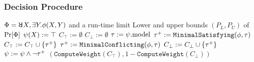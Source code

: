 \begin{frame}
  \frametitle{Decision Procedure}
  {\scriptsize
    \begin{algorithmic}[1]
      \REQUIRE
      $\Qf=\random{} X,\exists Y.\pf(X,Y)$ and a run-time limit \timeout
      \ENSURE
      Lower and upper bounds $(P_L,P_U)$ of $\Pr[\Phi]$
      \STATE $\psi(X) := \top$
      \STATE $C_\top := \emptyset$
      \STATE $C_\bot := \emptyset$
      \STATE $\tau := \psi.\mathrm{model}$
      \IF{($\sat{\pcf{\pf}{\as}}$)}
      \STATE $\tau^+ := \texttt{MinimalSatisfying}(\phi,\tau)$
      \STATE $C_\top := C_\top \cup \{\tau^+\}$
      \ELSE
      \STATE $\tau^+ := \texttt{MinimalConflicting}(\phi,\tau)$
      \STATE $C_\bot := C_\bot \cup \{\tau^+\}$
      \ENDIF
      \STATE $\psi := \psi \land \lnot\tau^+$
      \ENDWHILE
      \RETURN $(\texttt{ComputeWeight}(C_\top),1-\texttt{ComputeWeight}(C_\bot))$
    \end{algorithmic}
  }
\end{frame}